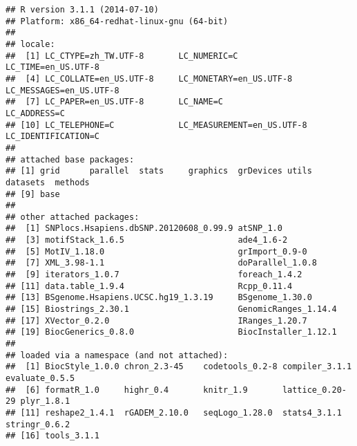 \documentclass[a4paper,10pt]{article}\usepackage[]{graphicx}\usepackage[]{color}
\makeatletter
\newenvironment{kframe}{%
 \def\at@end@of@kframe{}%
 \ifinner\ifhmode%
  \def\at@end@of@kframe{\end{minipage}}%
  \begin{minipage}{\columnwidth}%
 \fi\fi%
 \def\FrameCommand##1{\hskip\@totalleftmargin \hskip-\fboxsep
 \colorbox{shadecolor}{##1}\hskip-\fboxsep
     \hskip-\linewidth \hskip-\@totalleftmargin \hskip\columnwidth}%
 \MakeFramed {\advance\hsize-\width
   \@totalleftmargin\z@ \linewidth\hsize
   \@setminipage}}%
 {\par\unskip\endMakeFramed%
 \at@end@of@kframe}
\newenvironment{knitrout}{}{} %
\makeatother
\begin{document}
\begin{knitrout}
\color{fgcolor}\begin{kframe}
\begin{verbatim}
## R version 3.1.1 (2014-07-10)
## Platform: x86_64-redhat-linux-gnu (64-bit)
## 
## locale:
##  [1] LC_CTYPE=zh_TW.UTF-8       LC_NUMERIC=C               LC_TIME=en_US.UTF-8       
##  [4] LC_COLLATE=en_US.UTF-8     LC_MONETARY=en_US.UTF-8    LC_MESSAGES=en_US.UTF-8   
##  [7] LC_PAPER=en_US.UTF-8       LC_NAME=C                  LC_ADDRESS=C              
## [10] LC_TELEPHONE=C             LC_MEASUREMENT=en_US.UTF-8 LC_IDENTIFICATION=C       
## 
## attached base packages:
## [1] grid      parallel  stats     graphics  grDevices utils     datasets  methods  
## [9] base     
## 
## other attached packages:
##  [1] SNPlocs.Hsapiens.dbSNP.20120608_0.99.9 atSNP_1.0                             
##  [3] motifStack_1.6.5                       ade4_1.6-2                            
##  [5] MotIV_1.18.0                           grImport_0.9-0                        
##  [7] XML_3.98-1.1                           doParallel_1.0.8                      
##  [9] iterators_1.0.7                        foreach_1.4.2                         
## [11] data.table_1.9.4                       Rcpp_0.11.4                           
## [13] BSgenome.Hsapiens.UCSC.hg19_1.3.19     BSgenome_1.30.0                       
## [15] Biostrings_2.30.1                      GenomicRanges_1.14.4                  
## [17] XVector_0.2.0                          IRanges_1.20.7                        
## [19] BiocGenerics_0.8.0                     BiocInstaller_1.12.1                  
## 
## loaded via a namespace (and not attached):
##  [1] BiocStyle_1.0.0 chron_2.3-45    codetools_0.2-8 compiler_3.1.1  evaluate_0.5.5 
##  [6] formatR_1.0     highr_0.4       knitr_1.9       lattice_0.20-29 plyr_1.8.1     
## [11] reshape2_1.4.1  rGADEM_2.10.0   seqLogo_1.28.0  stats4_3.1.1    stringr_0.6.2  
## [16] tools_3.1.1
\end{verbatim}
\end{kframe}
\end{knitrout}


%
%



\end{document}

